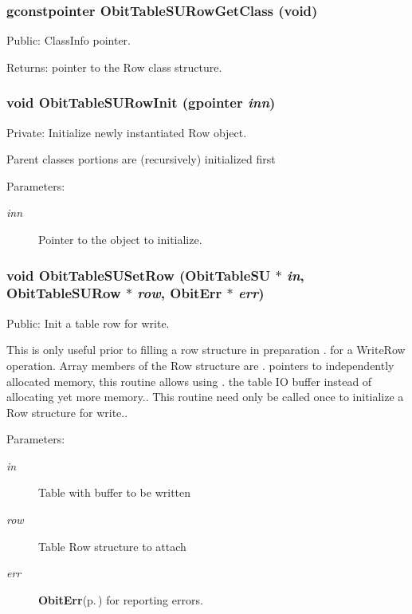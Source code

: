 \subsubsection{\setlength{\rightskip}{0pt plus 5cm}gconstpointer Obit\-Table\-SURow\-Get\-Class (void)}\label{ObitTableSU_8c_a15}


Public: Class\-Info pointer. 

\begin{Desc}
\item[Returns:]pointer to the Row class structure. \end{Desc}
\subsubsection{\setlength{\rightskip}{0pt plus 5cm}void Obit\-Table\-SURow\-Init (gpointer {\em inn})}\label{ObitTableSU_8c_a6}


Private: Initialize newly instantiated Row object. 

Parent classes portions are (recursively) initialized first \begin{Desc}
\item[Parameters:]
\begin{description}
\item[{\em inn}]Pointer to the object to initialize. \end{description}
\end{Desc}
\subsubsection{\setlength{\rightskip}{0pt plus 5cm}void Obit\-Table\-SUSet\-Row ({\bf Obit\-Table\-SU} $\ast$ {\em in}, {\bf Obit\-Table\-SURow} $\ast$ {\em row}, {\bf Obit\-Err} $\ast$ {\em err})}\label{ObitTableSU_8c_a23}


Public: Init a table row for write. 

This is only useful prior to filling a row structure in preparation . for a Write\-Row operation. Array members of the Row structure are . pointers to independently allocated memory, this routine allows using . the table IO buffer instead of allocating yet more memory.. This routine need only be called once to initialize a Row structure for write.. \begin{Desc}
\item[Parameters:]
\begin{description}
\item[{\em in}]Table with buffer to be written \item[{\em row}]Table Row structure to attach \item[{\em err}]{\bf Obit\-Err}{\rm (p.\,\pageref{structObitErr})} for reporting errors. \end{description}
\end{Desc}
